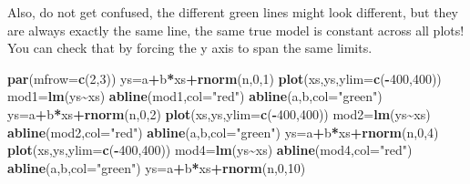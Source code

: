 \documentclass[
]{book}
\newenvironment{Shaded}{\begin{snugshade}}{\end{snugshade}}
\newcommand{\AttributeTok}[1]{\textcolor[rgb]{0.13,0.29,0.53}{#1}}
\newcommand{\DecValTok}[1]{\textcolor[rgb]{0.00,0.00,0.81}{#1}}
\newcommand{\FunctionTok}[1]{\textcolor[rgb]{0.13,0.29,0.53}{\textbf{#1}}}
\newcommand{\NormalTok}[1]{#1}
\newcommand{\OtherTok}[1]{\textcolor[rgb]{0.56,0.35,0.01}{#1}}
\newcommand{\SpecialCharTok}[1]{\textcolor[rgb]{0.81,0.36,0.00}{\textbf{#1}}}
\newcommand{\StringTok}[1]{\textcolor[rgb]{0.31,0.60,0.02}{#1}}
\begin{document}
Also, do not get confused, the different green lines might look different, but they are always exactly the same line, the same true model is constant across all plots! You can check that by forcing the y axis to span the same limits.

\begin{Shaded}
\begin{Highlighting}[]
\FunctionTok{par}\NormalTok{(}\AttributeTok{mfrow=}\FunctionTok{c}\NormalTok{(}\DecValTok{2}\NormalTok{,}\DecValTok{3}\NormalTok{))}
\NormalTok{ys}\OtherTok{=}\NormalTok{a}\SpecialCharTok{+}\NormalTok{b}\SpecialCharTok{*}\NormalTok{xs}\SpecialCharTok{+}\FunctionTok{rnorm}\NormalTok{(n,}\DecValTok{0}\NormalTok{,}\DecValTok{1}\NormalTok{)}
\FunctionTok{plot}\NormalTok{(xs,ys,}\AttributeTok{ylim=}\FunctionTok{c}\NormalTok{(}\SpecialCharTok{{-}}\DecValTok{400}\NormalTok{,}\DecValTok{400}\NormalTok{))}
\NormalTok{mod1}\OtherTok{=}\FunctionTok{lm}\NormalTok{(ys}\SpecialCharTok{\textasciitilde{}}\NormalTok{xs)}
\FunctionTok{abline}\NormalTok{(mod1,}\AttributeTok{col=}\StringTok{"red"}\NormalTok{)}
\FunctionTok{abline}\NormalTok{(a,b,}\AttributeTok{col=}\StringTok{"green"}\NormalTok{)}
\NormalTok{ys}\OtherTok{=}\NormalTok{a}\SpecialCharTok{+}\NormalTok{b}\SpecialCharTok{*}\NormalTok{xs}\SpecialCharTok{+}\FunctionTok{rnorm}\NormalTok{(n,}\DecValTok{0}\NormalTok{,}\DecValTok{2}\NormalTok{)}
\FunctionTok{plot}\NormalTok{(xs,ys,}\AttributeTok{ylim=}\FunctionTok{c}\NormalTok{(}\SpecialCharTok{{-}}\DecValTok{400}\NormalTok{,}\DecValTok{400}\NormalTok{))}
\NormalTok{mod2}\OtherTok{=}\FunctionTok{lm}\NormalTok{(ys}\SpecialCharTok{\textasciitilde{}}\NormalTok{xs)}
\FunctionTok{abline}\NormalTok{(mod2,}\AttributeTok{col=}\StringTok{"red"}\NormalTok{)}
\FunctionTok{abline}\NormalTok{(a,b,}\AttributeTok{col=}\StringTok{"green"}\NormalTok{)}
\NormalTok{ys}\OtherTok{=}\NormalTok{a}\SpecialCharTok{+}\NormalTok{b}\SpecialCharTok{*}\NormalTok{xs}\SpecialCharTok{+}\FunctionTok{rnorm}\NormalTok{(n,}\DecValTok{0}\NormalTok{,}\DecValTok{4}\NormalTok{)}
\FunctionTok{plot}\NormalTok{(xs,ys,}\AttributeTok{ylim=}\FunctionTok{c}\NormalTok{(}\SpecialCharTok{{-}}\DecValTok{400}\NormalTok{,}\DecValTok{400}\NormalTok{))}
\NormalTok{mod4}\OtherTok{=}\FunctionTok{lm}\NormalTok{(ys}\SpecialCharTok{\textasciitilde{}}\NormalTok{xs)}
\FunctionTok{abline}\NormalTok{(mod4,}\AttributeTok{col=}\StringTok{"red"}\NormalTok{)}
\FunctionTok{abline}\NormalTok{(a,b,}\AttributeTok{col=}\StringTok{"green"}\NormalTok{)}
\NormalTok{ys}\OtherTok{=}\NormalTok{a}\SpecialCharTok{+}\NormalTok{b}\SpecialCharTok{*}\NormalTok{xs}\SpecialCharTok{+}\FunctionTok{rnorm}\NormalTok{(n,}\DecValTok{0}\NormalTok{,}\DecValTok{10}\NormalTok{)}

\end{Highlighting}
\end{Shaded}
\end{document}
